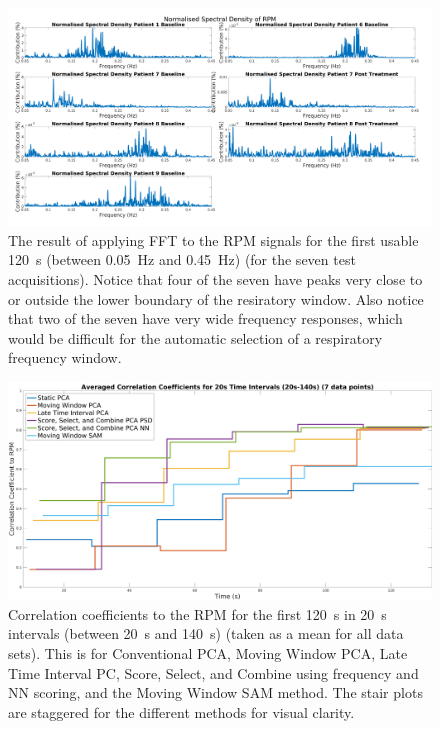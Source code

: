     \begin{figure}
        \centering
        
        \includegraphics[width=1.0\linewidth]{rpm_spectral_density.png}
        
        \captionsetup{singlelinecheck=false}
        \caption{The result of applying \gls{FFT} to the \gls{RPM} signals for the first usable \SI{120}{\second} (between \SI{0.05}{\hertz} and \SI{0.45}{\hertz}) (for the seven test acquisitions). Notice that four of the seven have peaks very close to or outside the lower boundary of the resiratory window. Also notice that two of the seven have very wide frequency responses, which would be difficult for the automatic selection of a respiratory frequency window.}
        \label{fig:rpm_spectral_density}
    \end{figure}
    
    \begin{figure}
        \centering
        
        \includegraphics[width=1.0\linewidth]{all_correlation_coefficient.png}
        
        \captionsetup{singlelinecheck=false}
        \caption{Correlation coefficients to the \gls{RPM} for the first \SI{120}{\second} in \SI{20}{\second} intervals (between \SI{20}{\second} and \SI{140}{\second}) (taken as a mean for all data sets). This is for Conventional \gls{PCA}, Moving Window \gls{PCA}, Late Time Interval \gls{PC}, Score, Select, and Combine using frequency and \gls{NN} scoring, and the Moving Window \gls{SAM} method. The stair plots are staggered for the different methods for visual clarity.}
        \label{fig:all_cross_correlation}
    \end{figure}
    
